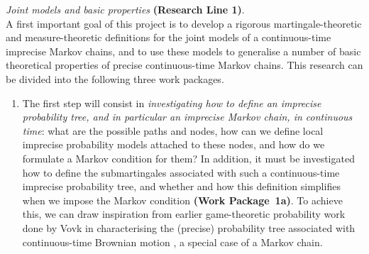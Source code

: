 \documentclass[11pt,dvipsnames,usenames,a4paper]{article}
\begin{document}
\emph{Joint models and basic properties} {\bf (Research Line 1)}.\\[3pt]
A first important goal of this project is to develop a rigorous martingale-theoretic and measure-theoretic definitions for the joint models of a continuous-time imprecise Markov chains, and to use these models to generalise a number of basic theoretical properties of precise continuous-time Markov chains. 
This research can be divided into the following three work packages.
\begin{enumerate}[label=\tiny$\blacksquare$,leftmargin=*,noitemsep]
\item The first step will consist in \emph{investigating how to define an imprecise probability tree, and in particular an imprecise Markov chain, in continuous time}: what are the possible paths and nodes, how can we define local imprecise probability models attached to these nodes, and how do we formulate a Markov condition for them?
In addition, it must be investigated how to define the submartingales associated with such a continuous-time imprecise probability tree, and whether and how this definition simplifies when we impose the Markov condition {\bf(Work Package~1a)}.
To achieve this, we can draw inspiration from earlier game-theoretic probability work done by Vovk in characterising the (precise) probability tree associated with continuous-time Brownian motion \cite{vovk2008:brownian,vovk2012:emergence:of:probability}, a special case of a Markov chain.

\end{enumerate}
\end{document}
